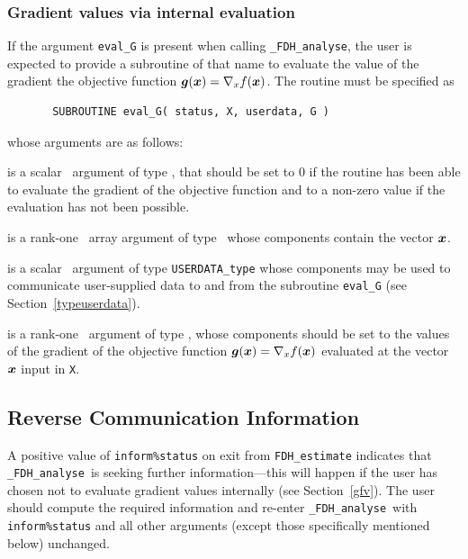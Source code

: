 \documentclass{galahad}
\newcommand{\packagename}{FDH}
\newcommand{\fullpackagename}{\libraryname\_\packagename}
\newcommand{\solver}{{\tt \fullpackagename\_analyse}}
\begin{document}

\subsubsection{Gradient values via internal evaluation\label{gfv}}

If the argument {\tt eval\_G} is present when calling \solver, the
user is expected to provide a subroutine of that name to evaluate the
value of the gradient the objective function ${\bm{g}}({\bm{x}}) = \nabla_x f({\bm{x}})$.
The routine must be specified as

\def\baselinestretch{0.8}
{\tt \begin{verbatim}
       SUBROUTINE eval_G( status, X, userdata, G )
\end{verbatim} }
\def\baselinestretch{1.0}
\noindent whose arguments are as follows:

\begin{description}
 is a scalar \intentout\ argument of type \integer,
that should be set to 0 if the routine has been able to evaluate
the gradient of the objective function
and to a non-zero value if the evaluation has not been possible.

 is a rank-one \intentin\ array argument of type \realdp\
whose components contain the vector ${\bm{x}}$.

 is a scalar \intentinout\ argument of type 
{\tt USERDATA\_type} whose components may be used
to communicate user-supplied data to and from the subroutine {\tt eval\_G}
(see Section~\ref{typeuserdata}). 

 is a rank-one \intentout\ argument of type \realdp,
whose components should be set to the values of the gradient 
of the objective function ${\bm{g}}({\bm{x}}) = \nabla_x f({\bm{x}})$
evaluated at the vector ${\bm{x}}$ input in {\tt X}.

\end{description}


\subsection{\label{reverse}Reverse Communication Information}

A positive value of {\tt inform\%status} on exit from 
{\tt \packagename\_estimate}
indicates that
\solver\ is seeking further information---this will happen 
if the user has chosen not to evaluate gradient
values internally (see Section~\ref{gfv}).
The user should compute the required information and re-enter \solver\
with {\tt inform\%status} and all other arguments (except those specifically
mentioned below) unchanged.
\end{document}
